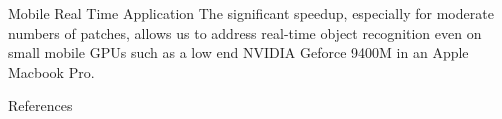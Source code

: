 \documentclass[final]{beamer}
\begin{document}
\begin{frame}{}
\begin{columns}[t]
\begin{column}{.48\linewidth}
        \begin{block}{Mobile Real Time Application}
        The significant speedup, especially for moderate numbers of patches, allows us to address real-time object recognition even on small mobile GPUs such as a low end NVIDIA Geforce 9400M in an Apple Macbook Pro.   \newline     
        \end{block}
        
        \begin{block}{References}
        \tiny
	
	
	\end{block}
	
       \end{column}
    \end{columns}
  \end{frame}
\end{document}
